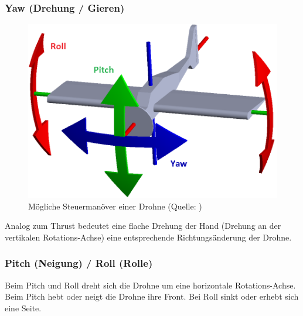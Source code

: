 
\newpage
\subsubsection{Yaw (Drehung / Gieren)}
\begin{figure}
	\includegraphics[width=1.0\linewidth]{images/concept/yaw_pitch_roll.png}
	\caption[Steuermanöver]{Mögliche Steuermanöver einer Drohne (Quelle: )}
\end{figure}
Analog zum Thrust bedeutet eine flache Drehung der Hand (Drehung an der vertikalen Rotations-Achse) eine entsprechende Richtungsänderung der Drohne.

\subsubsection{Pitch (Neigung) / Roll (Rolle)}
Beim Pitch und Roll dreht sich die Drohne um eine horizontale Rotations-Achse. Beim Pitch hebt oder neigt die Drohne ihre Front. Bei Roll sinkt oder erhebt sich eine Seite.

